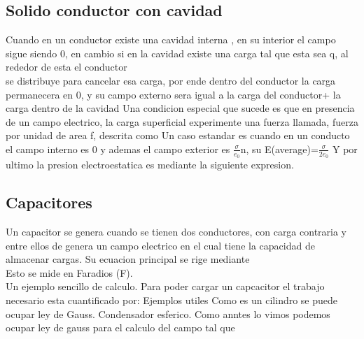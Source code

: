 \subsection{Solido conductor con cavidad}
Cuando en un conductor existe una cavidad interna , en su interior el campo sigue siendo 0, en cambio si en la cavidad existe una carga tal que esta sea q, al rededor de esta el conductor\\
se distribuye para cancelar esa carga, por ende dentro del conductor la carga permanecera en 0, y su campo externo sera igual a la carga del conductor+ la carga dentro de la cavidad 
Una condicion especial que sucede es que en presencia de un campo electrico, la carga superficial experimente una fuerza llamada, fuerza por unidad de area f, descrita como
Un caso estandar es cuando en un conducto el campo interno es 0 y ademas el campo exterior es $\frac{\sigma}{e_0}$n, su E(average)=$\frac{\sigma}{2e_0}$
Y por ultimo la presion electroestatica es mediante la siguiente expresion.
\newpage




\subsection{Capacitores}
Un capacitor se genera cuando se tienen dos conductores, con carga contraria  y  entre ellos de genera un campo electrico en el cual tiene la capacidad de almacenar cargas.
Su ecuacion principal se rige mediante
\\
Esto se mide en Faradios (F).\\ 
Un ejemplo sencillo de calculo.
Para poder cargar un capcacitor el trabajo necesario esta cuantificado por:
Ejemplos utiles
Como es un cilindro se puede ocupar ley de Gauss.
Condensador esferico.
Como anntes lo vimos podemos ocupar ley de gauss para el calculo del campo tal que

